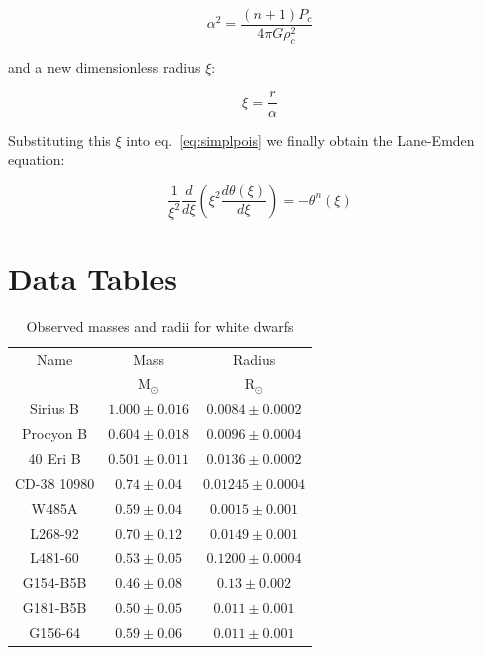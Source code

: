 \documentclass[twoside]{article}
\begin{document}
            \begin{equation}
                \label{eq:alpha}
                \alpha^2=\frac{(n+1)P_c}{4\pi G\rho_c^2}
            \end{equation}

            and a new dimensionless radius \(\xi\):

            \begin{equation}
                \label{eq:xi}
                \xi=\frac{r}{\alpha}
            \end{equation}

            Substituting this \(\xi\) into eq.~\ref{eq:simplpois} we finally
            obtain the Lane-Emden equation:

            \begin{equation}
                \frac{1}{\xi^2}\frac{d}{d\xi}\left(\xi^2\frac{d\theta(\xi)}{d\xi}\right)=-\theta^n(\xi)
            \end{equation}

\section{Data Tables}

\begin{table}[H]
    \caption{Observed masses and radii for white dwarfs}
    \centering
    \begin{tabular}{c c c}
    \toprule
    Name & Mass & Radius \\
         & \(\mathrm{M}_{\odot}\) & \(\mathrm{R}_{\odot}\) \\
    \midrule
    Sirius B & \(1.000\pm0.016\) & \(0.0084\pm0.0002\) \\
    Procyon B & \(0.604\pm0.018\) & \(0.0096\pm0.0004\) \\
    40 Eri B & \(0.501\pm0.011\) & \(0.0136\pm0.0002\) \\
    CD-38 10980 & \(0.74\pm0.04\) & \(0.01245\pm0.0004\) \\
    W485A & \(0.59\pm0.04\) & \(0.0015\pm0.001\) \\
    L268-92 & \(0.70\pm0.12\) & \(0.0149\pm0.001\) \\
    L481-60 & \(0.53\pm0.05\) & \(0.1200\pm0.0004\) \\
    G154-B5B & \(0.46\pm0.08\) & \(0.13\pm0.002\) \\
    G181-B5B & \(0.50\pm0.05\) & \(0.011\pm0.001\) \\
    G156-64 & \(0.59\pm0.06\) & \(0.011\pm0.001\) \\
    \bottomrule
    \end{tabular}
\end{table}
\end{document}
